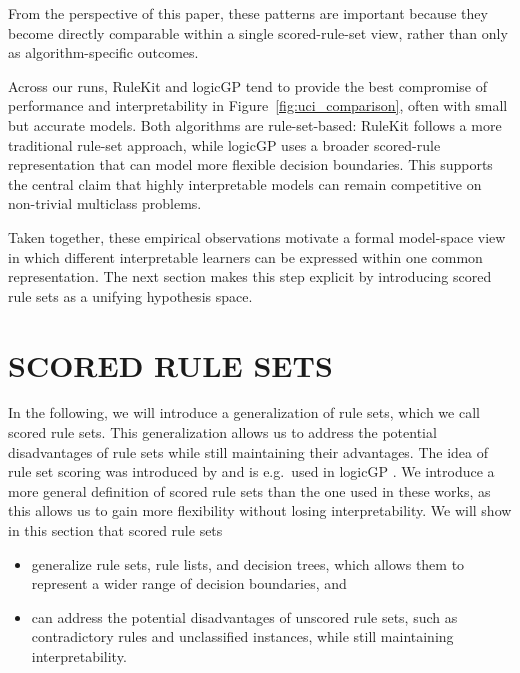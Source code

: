 \documentclass[a4paper,twoside]{article}
\begin{document}
From the perspective of this paper, these patterns are important because they become directly comparable within a single scored-rule-set view, rather than only as algorithm-specific outcomes.

Across our runs, RuleKit and logicGP tend to provide the best compromise of performance and interpretability in Figure~\ref{fig:uci_comparison}, often with small but accurate models. Both algorithms are rule-set-based: RuleKit follows a more traditional rule-set approach, while logicGP uses a broader scored-rule representation that can model more flexible decision boundaries. This supports the central claim that highly interpretable models can remain competitive on non-trivial multiclass problems.

Taken together, these empirical observations motivate a formal model-space view in which different interpretable learners can be expressed within one common representation. The next section makes this step explicit by introducing scored rule sets as a unifying hypothesis space.


\section{\uppercase{Scored Rule Sets}}

In the following, we will introduce a generalization of rule sets, which we call scored rule sets. This generalization allows us to address the potential disadvantages of rule sets while still maintaining their advantages. The idea of rule set scoring was introduced by \cite{10.1007/BFb0017011} and is e.g.\ used in logicGP \cite{10.1145/3712255.3734300}. We introduce a more general definition of scored rule sets than the one used in these works, as this allows us to gain more flexibility without losing interpretability. We will show in this section that scored rule sets 

\begin{itemize}
    \item generalize rule sets, rule lists, and decision trees, which allows them to represent a wider range of decision boundaries, and
    \item can address the potential disadvantages of unscored rule sets, such as contradictory rules and unclassified instances, while still maintaining interpretability.
\end{itemize}

\end{document}
